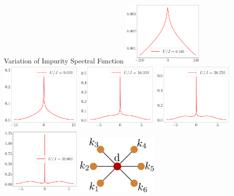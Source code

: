 \documentclass[aspectratio=169]{beamer}
\begin{document}
\begin{frame}[noframenumbering]{Variation of Impurity Spectral Function}
\centering
\includegraphics[width=0.3\textwidth]{figures/spec-func-gen-siam-U_by_J=0.100.pdf}
\includegraphics[width=0.3\textwidth]{figures/spec-func-gen-siam-U_by_J=9.000.pdf}
\includegraphics[width=0.3\textwidth]{figures/spec-func-gen-siam-U_by_J=16.000.pdf}
\includegraphics[width=0.3\textwidth]{figures/spec-func-gen-siam-U_by_J=20.250.pdf}
\includegraphics[width=0.3\textwidth]{figures/spec-func-gen-siam-U_by_J=36.000.pdf}
\includegraphics[width=0.3\textwidth]{figures/seven_site2.pdf}
\end{frame}
\end{document}
